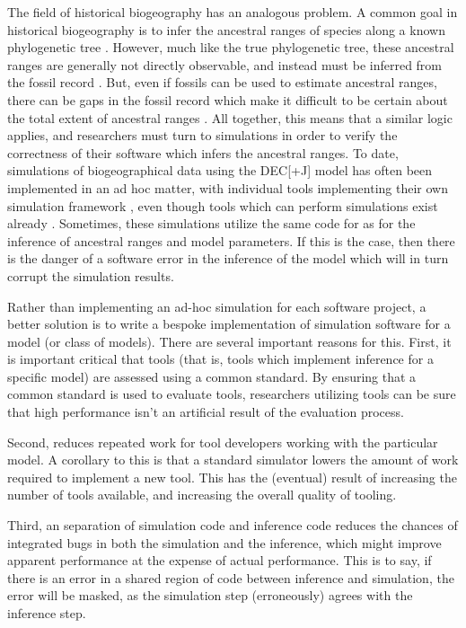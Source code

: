 \documentclass{article}
\begin{document}
The field of historical biogeography has an analogous problem.
A common goal in historical biogeography is to infer the ancestral ranges
of species along a known phylogenetic tree 
\citep{varela_phylogeny_2019, baker_global_2013, vicente_and_2017}.
However, much like the true phylogenetic tree, these ancestral ranges are
generally not directly observable, and instead must be inferred from the fossil
record \cite{mclachlan_reconstructing_2004}.
But, even if fossils can be used to estimate ancestral ranges, there can be gaps
in the fossil record which make it difficult to be certain about the total
extent of ancestral ranges \cite{kidwell_quality_2002}.
All together, this means that a similar logic applies, and researchers must turn
to simulations in order to verify the correctness of their software which infers
the ancestral ranges.
To date, simulations of biogeographical data using the DEC[+J] model has often
been implemented in an ad hoc matter, with individual tools implementing their
own simulation framework \cite{matzke_statistical_2022,
bettisworth_lagrange-ng_2023}, even though tools which can perform simulations
exist already \citep{hohna_revbayes_2016}.
Sometimes, these simulations utilize the same code for as for the inference of
ancestral ranges and model parameters.
If this is the case, then there is the danger of 
a software error in the inference of the model which will in turn corrupt the
simulation results.

Rather than implementing an ad-hoc simulation for each software project, a
better solution is to write a bespoke implementation of simulation software for
a model (or class of models).
There are several important reasons for this.
First, it is important critical that tools (that is, tools which implement inference for a specific model) are assessed
using a common standard.
By ensuring that a common standard is used to evaluate tools, researchers utilizing tools can be sure that high
performance isn't an artificial result of the evaluation process.

Second, reduces repeated work for tool developers working with the particular
model.
A corollary to this is that a standard simulator lowers the amount of work
required to implement a new tool.
This has the (eventual) result of increasing the number of tools available, and
increasing the overall quality of tooling.

Third, an separation of simulation code and inference code reduces the chances of integrated bugs in both the simulation
and the inference, which might improve apparent performance at the expense of actual performance.
This is to say, if there is an error in a shared region of code between inference and simulation, the error will be
masked, as the simulation step (erroneously) agrees with the inference step.
\end{document}
